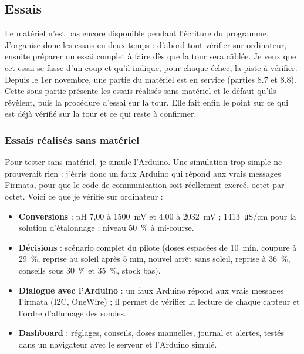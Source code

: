 \subsection{Essais}

Le matériel n'est pas encore disponible pendant l'écriture du programme. J'organise donc les essais en deux temps : d'abord tout vérifier sur ordinateur, ensuite préparer un essai complet à faire dès que la tour sera câblée. Je veux que cet essai se fasse d'un coup et qu'il indique, pour chaque échec, la piste à vérifier. Depuis le 1er novembre, une partie du matériel est en service (parties 8.7 et 8.8). Cette sous-partie présente les essais réalisés sans matériel et le défaut qu'ils révèlent, puis la procédure d'essai sur la tour. Elle fait enfin le point sur ce qui est déjà vérifié sur la tour et ce qui reste à confirmer.

\subsubsection*{Essais réalisés sans matériel}

Pour tester sans matériel, je simule l'Arduino. Une simulation trop simple ne prouverait rien : j'écris donc un faux Arduino qui répond aux vrais messages Firmata, pour que le code de communication soit réellement exercé, octet par octet. Voici ce que je vérifie sur ordinateur :

\begin{itemize}
\item \textbf{Conversions} : pH 7,00 à \qty{1500}{mV} et 4,00 à \qty{2032}{mV} ; \qty{1413}{\micro S/cm} pour la solution d'étalonnage ; niveau \qty{50}{\percent} à mi-course.
\item \textbf{Décisions} : scénario complet du pilote (doses espacées de \qty{10}{min}, coupure à \qty{29}{\percent}, reprise au soleil après 5 min, nouvel arrêt sans soleil, reprise à \qty{36}{\percent}, conseils sous \qty{30}{\percent} et \qty{35}{\percent}, stock bas).
\item \textbf{Dialogue avec l'Arduino} : un faux Arduino répond aux vrais messages Firmata (I2C, OneWire) ; il permet de vérifier la lecture de chaque capteur et l'ordre d'allumage des sondes.
\item \textbf{Dashboard} : réglages, conseils, doses manuelles, journal et alertes, testés dans un navigateur avec le serveur et l'Arduino simulé.
\end{itemize}

